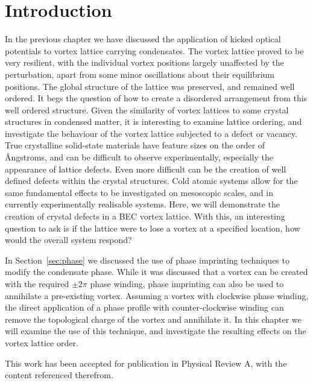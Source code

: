 \section{Introduction}\label{sec:ch6_intro}
In the previous chapter we have discussed the application of kicked optical potentials to vortex lattice carrying condensates. The vortex lattice proved to be very resilient, with the individual vortex positions largely unaffected by the perturbation, apart from some minor oscillations about their equilibrium positions. The global structure of the lattice was preserved, and remained well ordered. It begs the question of how to create a disordered arrangement from this well ordered structure. Given the similarity of vortex lattices to some crystal structures in condensed matter, it is interesting to examine lattice ordering, and investigate the behaviour of the vortex lattice subjected to a defect or vacancy. True crystalline solid-state materials have feature sizes on the order of {\AA}ngstroms, and can be difficult to observe experimentally, especially the appearance of lattice defects. Even more difficult can be the creation of well defined defects within the crystal structures. Cold atomic systems allow for the same fundamental effects to be investigated on mesoscopic scales, and in currently experimentally realisable systems. Here, we will demonstrate the creation of crystal defects in a BEC vortex lattice. With this, an interesting question to ask is if the lattice were to lose a vortex at a specified location, how would the overall system respond?

In Section~\ref{sec:phase} we discussed the use of phase imprinting techniques to modify the condensate phase. While it was discussed that a vortex can be created with the required $\pm 2\pi$ phase winding, phase imprinting can also be used to annihilate a pre-existing vortex. Assuming a vortex with clockwise phase winding, the direct application of a phase profile with counter-clockwise winding can remove the topological charge of the vortex and annihilate it. In this chapter we will examine the use of this technique, and investigate the resulting effects on the vortex lattice order.

This work has been accepted for publication in Physical Review A, with the content referenced therefrom.

